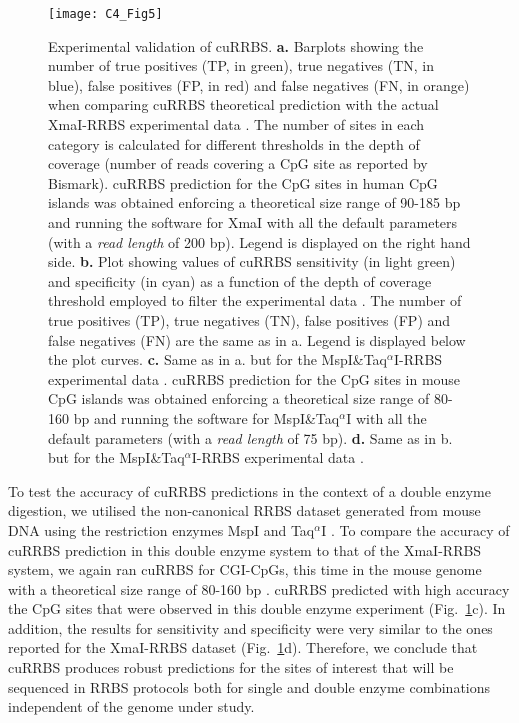 \begin{figure}[htbp!] 
	\centering    
	\texttt{[image: C4\_Fig5]}
	\vspace*{2mm}
	\caption[Experimental validation of cuRRBS]{Experimental validation of cuRRBS. \textbf{a.} Barplots showing the number of true positives (\acrshort{TP}, in green), true negatives (\acrshort{TN}, in blue), false positives (\acrshort{FP}, in red) and false negatives (\acrshort{FN}, in orange) when comparing cuRRBS theoretical prediction with the actual XmaI-RRBS experimental data \cite{Tanas2017}. The number of sites in each category is calculated for different thresholds in the depth of coverage (number of reads covering a CpG site as reported by Bismark). cuRRBS prediction for the CpG sites in human CpG islands was obtained enforcing a theoretical size range of 90-185 bp and running the software for XmaI with all the default parameters (with a \textit{read length} of 200 bp). Legend is displayed on the right hand side. \textbf{b.} Plot showing values of cuRRBS sensitivity (in light green) and specificity (in cyan) as a function of the depth of coverage threshold employed to filter the experimental data \cite{Tanas2017}. The number of true positives (TP), true negatives (TN), false positives (FP) and false negatives (FN) are the same as in a. Legend is displayed below the plot curves. \textbf{c.} Same as in a. but for the MspI\&Taq$^\alpha$I-RRBS experimental data \cite{Lim2016}. cuRRBS prediction for the CpG sites in mouse CpG islands was obtained enforcing a theoretical size range of 80-160 bp and running the software for MspI\&Taq$^\alpha$I with all the default parameters (with a \textit{read length} of 75 bp). \textbf{d.} Same as in b. but for the MspI\&Taq$^\alpha$I-RRBS experimental data \cite{Lim2016}.}
	\label{fig:c4_fig5}
\end{figure}

\bigskip

To test the accuracy of cuRRBS predictions in the context of a double enzyme digestion, we utilised the non-canonical RRBS dataset generated from mouse DNA using the restriction enzymes MspI and Taq$^\alpha$I \cite{Lim2016}. To compare the accuracy of cuRRBS prediction in this double enzyme system to that of the XmaI-RRBS system, we again ran cuRRBS for CGI-CpGs, this time in the mouse genome with a theoretical size range of 80-160 bp \cite{Lim2016}. cuRRBS predicted with high accuracy the CpG sites that were observed in this double enzyme experiment (Fig.~\ref{fig:c4_fig5}c). In addition, the results for sensitivity and specificity were very similar to the ones reported for the XmaI-RRBS dataset (Fig.~\ref{fig:c4_fig5}d). Therefore, we conclude that cuRRBS produces robust predictions for the sites of interest that will be sequenced in RRBS protocols both for single and double enzyme combinations independent of the genome under study.


